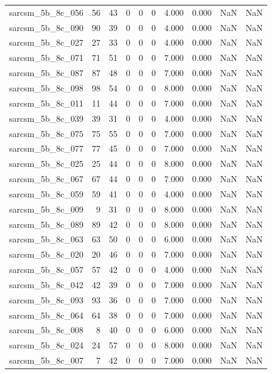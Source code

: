 \documentclass{article}
\begin{document}
\begin{longtable}{lrrrrrrrrr}
sarcsm\_5b\_8c\_056 & 56 & 43 & 0 & 0 & 0 & 4.000 & 0.000 & NaN & NaN \\
sarcsm\_5b\_8c\_090 & 90 & 39 & 0 & 0 & 0 & 4.000 & 0.000 & NaN & NaN \\
sarcsm\_5b\_8c\_027 & 27 & 33 & 0 & 0 & 0 & 4.000 & 0.000 & NaN & NaN \\
sarcsm\_5b\_8c\_071 & 71 & 51 & 0 & 0 & 0 & 7.000 & 0.000 & NaN & NaN \\
sarcsm\_5b\_8c\_087 & 87 & 48 & 0 & 0 & 0 & 7.000 & 0.000 & NaN & NaN \\
sarcsm\_5b\_8c\_098 & 98 & 54 & 0 & 0 & 0 & 8.000 & 0.000 & NaN & NaN \\
sarcsm\_5b\_8c\_011 & 11 & 44 & 0 & 0 & 0 & 7.000 & 0.000 & NaN & NaN \\
sarcsm\_5b\_8c\_039 & 39 & 31 & 0 & 0 & 0 & 4.000 & 0.000 & NaN & NaN \\
sarcsm\_5b\_8c\_075 & 75 & 55 & 0 & 0 & 0 & 7.000 & 0.000 & NaN & NaN \\
sarcsm\_5b\_8c\_077 & 77 & 45 & 0 & 0 & 0 & 7.000 & 0.000 & NaN & NaN \\
sarcsm\_5b\_8c\_025 & 25 & 44 & 0 & 0 & 0 & 8.000 & 0.000 & NaN & NaN \\
sarcsm\_5b\_8c\_067 & 67 & 44 & 0 & 0 & 0 & 7.000 & 0.000 & NaN & NaN \\
sarcsm\_5b\_8c\_059 & 59 & 41 & 0 & 0 & 0 & 4.000 & 0.000 & NaN & NaN \\
sarcsm\_5b\_8c\_009 & 9 & 31 & 0 & 0 & 0 & 8.000 & 0.000 & NaN & NaN \\
sarcsm\_5b\_8c\_089 & 89 & 42 & 0 & 0 & 0 & 8.000 & 0.000 & NaN & NaN \\
sarcsm\_5b\_8c\_063 & 63 & 50 & 0 & 0 & 0 & 6.000 & 0.000 & NaN & NaN \\
sarcsm\_5b\_8c\_020 & 20 & 46 & 0 & 0 & 0 & 7.000 & 0.000 & NaN & NaN \\
sarcsm\_5b\_8c\_057 & 57 & 42 & 0 & 0 & 0 & 4.000 & 0.000 & NaN & NaN \\
sarcsm\_5b\_8c\_042 & 42 & 39 & 0 & 0 & 0 & 7.000 & 0.000 & NaN & NaN \\
sarcsm\_5b\_8c\_093 & 93 & 36 & 0 & 0 & 0 & 7.000 & 0.000 & NaN & NaN \\
sarcsm\_5b\_8c\_064 & 64 & 38 & 0 & 0 & 0 & 7.000 & 0.000 & NaN & NaN \\
sarcsm\_5b\_8c\_008 & 8 & 40 & 0 & 0 & 0 & 6.000 & 0.000 & NaN & NaN \\
sarcsm\_5b\_8c\_024 & 24 & 57 & 0 & 0 & 0 & 8.000 & 0.000 & NaN & NaN \\
sarcsm\_5b\_8c\_007 & 7 & 42 & 0 & 0 & 0 & 7.000 & 0.000 & NaN & NaN \\

\end{longtable}
\end{document}
